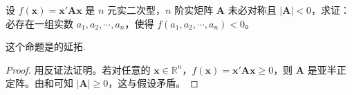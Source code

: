 \documentclass[../../main.tex]{subfiles}%
\begin{document}
\begin{proposition}\label{proposition:对应矩阵的行列式小于零的二次型必存在小于零的一点}
设 \(f(\boldsymbol{x})=\boldsymbol{x}'\boldsymbol{A}\boldsymbol{x}\) 是 \(n\) 元实二次型，\(n\) 阶实矩阵 \(\boldsymbol{A}\) 未必对称且 \(|\boldsymbol{A}|<0\)，求证：必存在一组实数 \(a_1,a_2,\cdots,a_n\)，使得 \(f(a_1,a_2,\cdots,a_n)<0\)。
\end{proposition}
\begin{remark}
这个命题是的延拓.
\end{remark}
\begin{proof}
用反证法证明。若对任意的 \(\boldsymbol{x}\in\mathbb{R}^n\)，\(f(\boldsymbol{x})=\boldsymbol{x}'\boldsymbol{A}\boldsymbol{x}\geqslant 0\)，则 \(\boldsymbol{A}\) 是亚半正定阵。由和可知 \(|\boldsymbol{A}|\geqslant 0\)，这与假设矛盾。
\end{proof}
\end{document}
